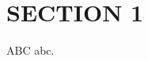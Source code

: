 \documentclass[dvipdfmx,11pt,uplatex, notheorems]{beamer}
\begin{document}
\section{SECTION 1}

\begin{frame}{ABC}
  abc.
\end{frame}
\end{document}
